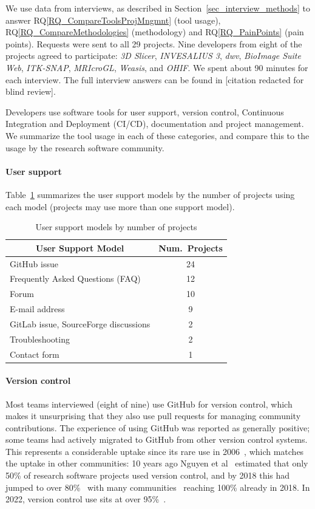 \documentclass[doubleblind,12pt, 3p, times]{elsarticle}
\newcommand{\rqref}[1]{RQ\ref{#1}}
\begin{document}
We use data from interviews, as described in Section~\ref{sec_interview_methods}
to answer \rqref{RQ_CompareToolsProjMngmnt} (tool usage),
\rqref{RQ_CompareMethodologies} (methodology) and \rqref{RQ_PainPoints} (pain
points). Requests were sent to all 29 projects.  Nine developers from eight of
the projects agreed to participate: \textit{3D Slicer}, \textit{INVESALIUS 3},
\textit{dwv}, \textit{BioImage Suite Web}, \textit{ITK-SNAP},
\textit{MRIcroGL}, \textit{Weasis}, and \textit{OHIF}. We spent about 90
minutes for each interview. The full interview answers can be
found in [citation redacted for blind review].

Developers use software tools for user support, version control,
Continuous Integration and Deployment (CI/CD), documentation and project
management.  We summarize the tool usage in each of these categories, and
compare this to the usage by the research software community.

\paragraph{User support} Table~\ref{tab_user_support_model} summarizes the user
support models by the number of projects using each model (projects may use
more than one support model).

\begin{table}[ht!]
\centering
\begin{tabular}{lc}
\toprule
\multicolumn{1}{c}{User Support Model} & Num.\ Projects \\
\midrule
GitHub issue & 24 \\
Frequently Asked Questions (FAQ) & 12 \\
Forum & 10 \\
E-mail address & 9 \\
GitLab issue, SourceForge discussions & 2 \\
Troubleshooting & 2 \\
Contact form & 1 \\ 
\bottomrule
\end{tabular}
\caption{\label{tab_user_support_model}User support models by number of projects}
\end{table}

\paragraph{Version control} Most teams interviewed (eight of nine) use GitHub
for version control, which makes it unsurprising that they also use pull
requests for managing community contributions. The experience of using GitHub
was reported as generally positive; some teams had actively migrated to GitHub
from other version control systems.  This represents a considerable uptake since
its rare use in 2006~\cite{Wilson2006}, which matches the uptake in other
communities: 10 years ago Nguyen et al~\cite{Nguyen-HoanEtAl2010} estimated that
only 50\% of research software projects used version control, and by 2018 this
had jumped to over 80\%~\cite{AlNoamanyAndBorghi2018} with many
communities~\cite{Smith2018} reaching 100\% already in 2018. In 2022, version
control use sits at over 95\%~\cite{CarverEtAl2022}.
\end{document}
